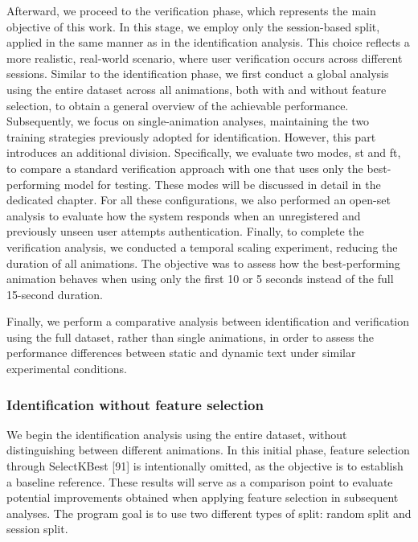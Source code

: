 \documentclass{article}
\begin{document}
Afterward, we proceed to the verification phase, which represents the main objective of this work.
In this stage, we employ only the session-based split, applied in the same manner as in the identification analysis.
This choice reflects a more realistic, real-world scenario, where user verification occurs across different sessions.
Similar to the identification phase, we first conduct a global analysis using the entire dataset across all animations, both with and without feature selection, to obtain a general overview of the achievable performance.
Subsequently, we focus on single-animation analyses, maintaining the two training strategies previously adopted for identification.
However, this part introduces an additional division.
Specifically, we evaluate two modes, st and ft, to compare a standard verification approach with one that uses only the best-performing model for testing. 
These modes will be discussed in detail in the dedicated chapter.
For all these configurations, we also performed an open-set analysis to evaluate how the system responds when an unregistered and previously unseen user attempts authentication.
Finally, to complete the verification analysis, we conducted a temporal scaling experiment, reducing the duration of all animations. 
The objective was to assess how the best-performing animation behaves when using only the first 10 or 5 seconds instead of the full 15-second duration.

Finally, we perform a comparative analysis between identification and verification using the full dataset, rather than single animations, in order to assess the performance differences between static and dynamic text under similar experimental conditions.

\subsubsection{Identification without feature selection}
\label{subsec:id_fs_ch}

We begin the identification analysis using the entire dataset, without distinguishing between different animations.
In this initial phase, feature selection through SelectKBest [91] is intentionally omitted, as the objective is to establish a baseline reference. 
These results will serve as a comparison point to evaluate potential improvements obtained when applying feature selection in subsequent analyses.
The program goal is to use two different types of split: random split and session split.
\end{document}
